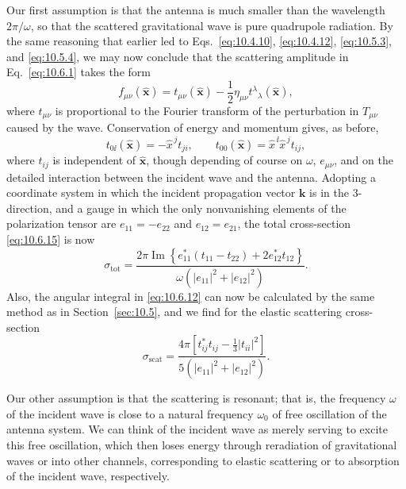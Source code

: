 Our first assumption is that the antenna is much smaller than the wavelength
\(2\pi/\omega\), so that the scattered gravitational wave is pure quadrupole
radiation. By the same reasoning that earlier led to
Eqs.~\eqref{eq:10.4.10}, \eqref{eq:10.4.12}, \eqref{eq:10.5.3}, and
\eqref{eq:10.5.4}, we may now conclude that the scattering amplitude in
Eq.~\eqref{eq:10.6.1} takes the form
\begin{equation}
  f_{\mu\nu}(\widehat{\mathbf{x}})
  =
  t_{\mu\nu}(\widehat{\mathbf{x}})
  -\frac12\eta_{\mu\nu}
  t^\lambda{}_\lambda(\widehat{\mathbf{x}}),
  \tag{10.7.1}\label{eq:10.7.1}
\end{equation}
where \(t_{\mu\nu}\) is proportional to the Fourier transform of the
perturbation in \(T_{\mu\nu}\) caused by the wave. Conservation of energy and
momentum gives, as before,
\begin{equation}
  t_{0\ii}(\widehat{\mathbf{x}})
  =
  -\widehat x^{\,j}t_{ji},
  \qquad
  t_{00}(\widehat{\mathbf{x}})
  =
  \widehat x^{\,\ii}\widehat x^{\,j}t_{ij},
  \tag{10.7.2}\label{eq:10.7.2}
\end{equation}
where \(t_{ij}\) is independent of \(\widehat{\mathbf{x}}\), though depending
of course on \(\omega\), \(e_{\mu\nu}\), and on the detailed interaction
between the incident wave and the antenna. Adopting a coordinate system in
which the incident propagation vector \(\mathbf{k}\) is in the 3-direction,
and a gauge in which the only nonvanishing elements of the polarization tensor
are \(e_{11}=-e_{22}\) and \(e_{12}=e_{21}\), the total cross-section
\eqref{eq:10.6.15} is now
\begin{equation}
  \sigma_{\mathrm{tot}}
  =
  \frac{
    2\pi\operatorname{Im}\!\left\{
      e_{11}^*(t_{11}-t_{22})+2e_{12}^*t_{12}
    \right\}
  }{
    \omega\left(\lvert e_{11}\rvert^2+\lvert e_{12}\rvert^2\right)
  }.
  \tag{10.7.3}\label{eq:10.7.3}
\end{equation}
Also, the angular integral in \eqref{eq:10.6.12} can now be calculated by the
same method as in Section~\ref{sec:10.5}, and we find for the elastic
scattering cross-section
\begin{equation}
  \sigma_{\mathrm{scat}}
  =
  \frac{
    4\pi\left[
      t_{ij}^*t_{ij}-\frac13\lvert t_{ii}\rvert^2
    \right]
  }{
    5\left(\lvert e_{11}\rvert^2+\lvert e_{12}\rvert^2\right)
  }.
  \tag{10.7.4}\label{eq:10.7.4}
\end{equation}

Our other assumption is that the scattering is resonant; that is, the
frequency \(\omega\) of the incident wave is close to a natural frequency
\(\omega_0\) of free oscillation of the antenna system. We can think of the
incident wave as merely serving to excite this free oscillation, which then
loses energy through reradiation of gravitational waves or into other channels,
corresponding to elastic scattering or to absorption of the incident wave,
respectively.

